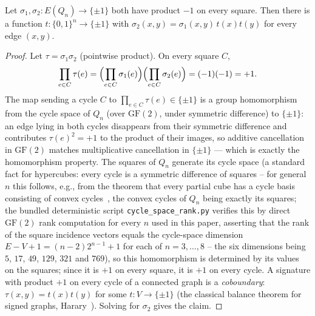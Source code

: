 \documentclass[12pt]{article}
\begin{document}
\begin{lemma}\label{lem:switching}
Let $\sigma_1,\sigma_2:E(Q_n)\to\{\pm1\}$ both have product $-1$ on every
square. Then there is a function $t:\{0,1\}^n\to\{\pm1\}$ with
$\sigma_2(x,y)=\sigma_1(x,y)\,t(x)t(y)$ for every edge $(x,y)$.
\end{lemma}
\begin{proof}
Let $\tau=\sigma_1\sigma_2$ (pointwise product). On every square $C$,
\[
\prod_{e\in C}\tau(e)
=\Bigl(\prod_{e\in C}\sigma_1(e)\Bigr)\Bigl(\prod_{e\in C}\sigma_2(e)\Bigr)
=(-1)(-1)=+1.
\]
The map sending a cycle $C$ to $\prod_{e\in C}\tau(e)\in\{\pm1\}$ is a group
homomorphism from the cycle space of $Q_n$ (over $\mathrm{GF}(2)$, under
symmetric difference) to $\{\pm1\}$: an edge lying in both cycles
disappears from their symmetric difference and contributes
$\tau(e)^2=+1$ to the product of their images, so additive cancellation
in $\mathrm{GF}(2)$ matches multiplicative cancellation in $\{\pm1\}$
--- which is exactly the homomorphism property. The
squares of $Q_n$ generate its cycle space (a standard fact for hypercubes:
every cycle is a symmetric difference of squares -- for general $n$ this
follows, e.g., from the theorem that every partial cube has a cycle basis
consisting of convex cycles~\cite{HLS14}, the convex cycles of $Q_n$ being
exactly its squares; the bundled
deterministic script \texttt{cycle\_space\_rank.py} verifies this by
direct $\mathrm{GF}(2)$ rank computation for every $n$ used in this
paper, asserting that the rank of the square incidence vectors equals
the cycle-space dimension $E-V+1=(n-2)2^{n-1}+1$ for each of
$n=3,\ldots,8$ -- the six dimensions being $5$, $17$, $49$, $129$,
$321$ and $769$), so this homomorphism is
determined by its values on the squares; since it is $+1$ on every square,
it is $+1$ on every cycle. A signature with product $+1$ on every cycle of
a connected graph is a \emph{coboundary}: $\tau(x,y)=t(x)t(y)$ for some
$t:V\to\{\pm1\}$ (the classical balance theorem for signed graphs,
Harary~\cite{Har53}). Solving for $\sigma_2$ gives the claim.
\end{proof}
\end{document}
